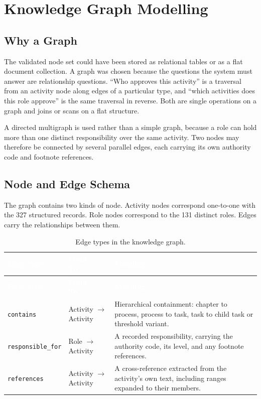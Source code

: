 \section{Knowledge Graph Modelling}

\subsection{Why a Graph}

The validated node set could have been stored as relational tables or as a flat document collection. A graph was chosen because the questions the system must answer are relationship questions. ``Who approves this activity'' is a traversal from an activity node along edges of a particular type, and ``which activities does this role approve'' is the same traversal in reverse. Both are single operations on a graph and joins or scans on a flat structure.

A directed multigraph is used rather than a simple graph, because a role can hold more than one distinct responsibility over the same activity. Two nodes may therefore be connected by several parallel edges, each carrying its own authority code and footnote references.

\subsection{Node and Edge Schema}

The graph contains two kinds of node. Activity nodes correspond one-to-one with the 327 structured records. Role nodes correspond to the 131 distinct roles. Edges carry the relationships between them.

\begin{longtable}{|p{}|p{}|p{}|}
\caption{Edge types in the knowledge graph.}\label{tab:edges}\\
\hline
\rowcolor{myblue}\textcolor{white}{\textbf{Edge type}} & \textcolor{white}{\textbf{From $\rightarrow$ To}} & \textcolor{white}{\textbf{Meaning}} \\
\hline
\endfirsthead
\hline
\rowcolor{myblue}\textcolor{white}{\textbf{Edge type}} & \textcolor{white}{\textbf{From $\rightarrow$ To}} & \textcolor{white}{\textbf{Meaning}} \\
\hline
\endhead
\texttt{contains} & Activity $\rightarrow$ Activity & Hierarchical containment: chapter to process, process to task, task to child task or threshold variant. \\ \hline
\texttt{responsible\_for} & Role $\rightarrow$ Activity & A recorded responsibility, carrying the authority code, its level, and any footnote references. \\ \hline
\texttt{references} & Activity $\rightarrow$ Activity & A cross-reference extracted from the activity's own text, including ranges expanded to their members. \\ \hline
\end{longtable}

